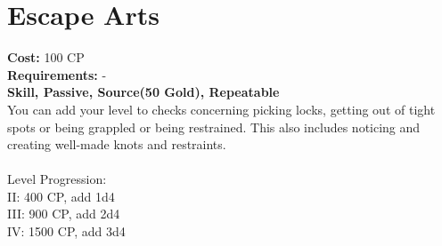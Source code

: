 \section{Escape Arts}
\textbf{Cost:} 100 CP\\
\textbf{Requirements:} -\\
\textbf{Skill, Passive, Source(50 Gold), Repeatable}\\
You can add your level to checks concerning picking locks, getting out of tight spots or being grappled or being restrained. This also includes noticing and creating well-made knots and restraints.\\
\\
Level Progression:\\
II: 400 CP, add 1d4\\
III: 900 CP, add 2d4\\
IV: 1500 CP, add 3d4\\
